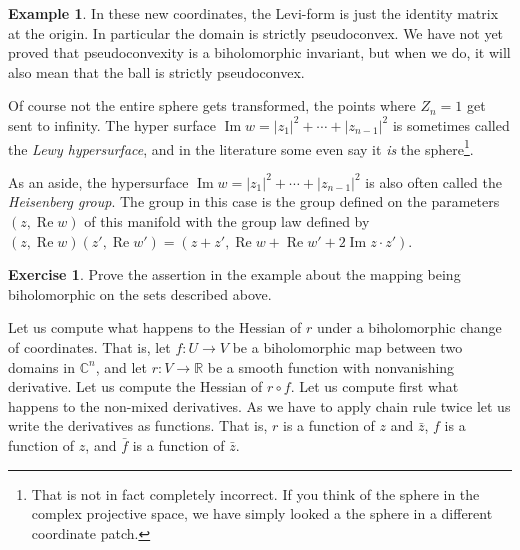 \documentclass[12pt,openany]{book}
\renewcommand{\Re}{\operatorname{Re}}
\renewcommand{\Im}{\operatorname{Im}}
\newcommand{\sabs}[1]{\lvert {#1} \rvert}
\newcommand{\C}{{\mathbb{C}}}
\newcommand{\R}{{\mathbb{R}}}
\newcommand{\myindex}[1]{#1\index{#1}}
\theoremstyle{plain}
\theoremstyle{remark}
\theoremstyle{definition}
\newenvironment{exbox}{%
    \def\FrameCommand{\vrule width 1pt \relax\hspace {10pt}}%
    \MakeFramed {\advance \hsize -\width \FrameRestore }%
}{%
    \endMakeFramed
}
\theoremstyle{exercise}
\newtheorem{exercise}{Exercise}[section]
\theoremstyle{example}
\newtheorem{example}[thm]{Example}
\begin{document}
\begin{example}
In these new coordinates, the Levi-form is just the identity matrix at the
origin.  In particular the domain is strictly pseudoconvex.
We have not yet proved that pseudoconvexity is a biholomorphic invariant,
but when we do, it will also mean that the ball is strictly pseudoconvex.

Of course not the entire sphere gets transformed, the points where $Z_n=1$
get sent to infinity.
The hyper surface $\Im w = \sabs{z_1}^2 + \cdots + \sabs{z_{n-1}}^2$
is sometimes called the \emph{\myindex{Lewy hypersurface}}, and in the
literature some even say it \emph{is} the sphere\footnote{That is not in fact
completely incorrect.  If you think of the sphere in the complex projective
space,
we have simply looked a the sphere in a different coordinate patch.}.

As an aside,
the hypersurface 
$\Im w = \sabs{z_1}^2 + \cdots + \sabs{z_{n-1}}^2$ is also often called the
\emph{\myindex{Heisenberg group}}.  The group in this case
is the group defined on the parameters $(z,\Re w)$ of this manifold with the
group law defined by $(z,\Re w)(z',\Re w') =
(z+z',\Re w + \Re w' + 2 \Im z \cdot z')$.
\end{example}

\begin{exbox}
\begin{exercise}
Prove the assertion in the example about the mapping being biholomorphic
on the sets described above.
\end{exercise}
\end{exbox}

Let us compute what happens to the Hessian of $r$ under a biholomorphic change
of coordinates.  That is, let $f \colon U \to V$ be a biholomorphic map
between two domains in $\C^n$, and let $r \colon V \to \R$ be a smooth
function with nonvanishing derivative.  Let us compute the Hessian of
$r \circ f$.  Let us compute first what happens to the non-mixed derivatives.
As we have to apply chain rule twice let us write the
derivatives as functions.  That is, $r$ is a function of $z$ and $\bar{z}$,
$f$ is a function of $z$, and $\bar{f}$ is a function of $\bar{z}$.
\end{document}
